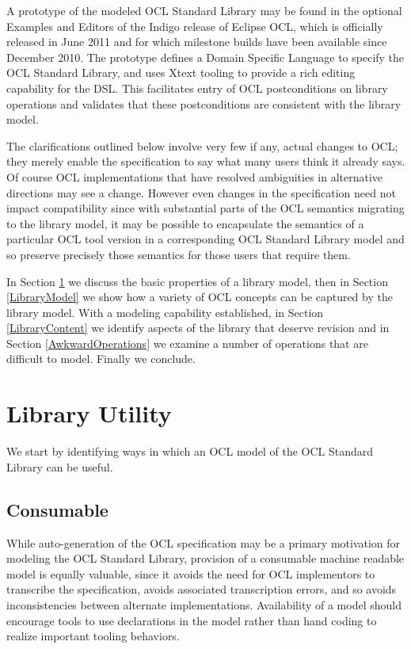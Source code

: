 \documentclass{eceasst}
\begin{document}
A prototype of the modeled OCL Standard Library may be found in the optional Examples and Editors of the Indigo release of Eclipse OCL, which is officially released in June 2011 and for which milestone builds have been available since December 2010. The prototype defines a Domain Specific Language to specify the OCL Standard Library, and uses Xtext tooling to provide a rich editing capability for the DSL. This facilitates entry of OCL postconditions on library operations and validates that these postconditions are consistent with the library model.

The clarifications outlined below involve very few if any, actual changes to OCL; they merely enable the specification to say what many users think it already says. Of course OCL implementations that have resolved ambiguities in alternative directions may see a change. However even changes in the specification need not impact compatibility since with substantial parts of the OCL semantics migrating to the library model, it may be possible to encapsulate the semantics of a particular OCL tool version in a corresponding OCL Standard Library model and so preserve precisely those semantics for those users that require them.

In Section \ref{LibraryUtility} we discuss the basic properties of a library model, then in Section \ref{LibraryModel} we show how a variety of OCL concepts can be captured by the library model. With a modeling capability established, in Section \ref{LibraryContent} we identify aspects of the library that deserve revision and in Section \ref{AwkwardOperations} we examine a number of operations that are difficult to model. Finally we conclude. 

\section{Library Utility}\label{LibraryUtility}

We start by identifying ways in which an OCL model of the OCL Standard Library can be useful.
 
\subsection{Consumable}

While auto-generation of the OCL specification may be a primary motivation for modeling the OCL Standard Library, provision of a consumable machine readable model is equally valuable, since it avoids the need for OCL implementors to transcribe the specification, avoids associated transcription errors, and so avoids inconsistencies between alternate implementations. Availability of a model should encourage tools to use declarations in the model rather than hand coding to realize important tooling behaviors.
\end{document}
